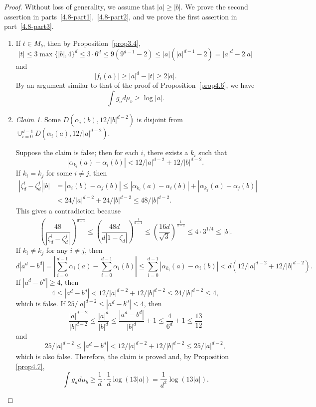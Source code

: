 \documentclass[11pt]{amsart}
\numberwithin{equation}{section}
\theoremstyle{plain}
\theoremstyle{definition}
\theoremstyle{remark}
\newtheorem*{claim*}{Claim}
\begin{document}
\begin{proof}
Without loss of generality, we assume that $|a|\geq|b|$. We prove
the second assertion in parts~\eqref{4.8-part1},~\eqref{4.8-part2}, and we prove the first assertion
in part~\eqref{4.8-part3}.

\begin{enumerate}[wide]
\item\label{4.8-part1}
   If $t\in M_{b}$, then by
Proposition~\ref{prop3.4},
\[
|t|\leq3\max\{|b|,4\}^{d}\leq3\cdot6^{d}\leq9\left(9^{d-1}-2\right)\leq|a|\left(|a|^{d-1}-2\right)=|a|^{d}-2|a|
\]
and
\[
|f_{t}(a)|\geq|a|^{d}-|t|\geq2|a|.
\]
By an argument similar to that of the proof of Proposition~\ref{prop4.6},
we have
\[
\int g_{a}d\mu_{b}\geq\log|a|.
\]

\item\label{4.8-part2}

\begin{claim*} Some $D(\alpha_{i}(b),12/|b|^{d-2})$ is disjoint
from $\cup_{i=0}^{d-1}D(\alpha_{i}(a),12/|a|^{d-2})$.
\end{claim*}

Suppose the claim is false; then for each $i$, there exists a $k_{i}$ such that
\[
|\alpha_{k_{i}}(a)-\alpha_{i}(b)|<12/|a|^{d-2}+12/|b|^{d-2}.
\]
If $k_{i}=k_{j}$ for some $i\neq j$, then
\begin{align*}
\left|\zeta_{d}^{i}-\zeta_{d}^{j}\right||b| & =|\alpha_{i}(b)-\alpha_{j}(b)|\leq|\alpha_{k_{i}}(a)-\alpha_{i}(b)|+|\alpha_{k_{j}}(a)-\alpha_{j}(b)|\\
 & <24/|a|^{d-2}+24/|b|^{d-2}\leq48/|b|^{d-2}.
\end{align*}
This gives a contradiction because
\[
\left(\frac{48}{\left|\zeta_{d}^{i}-\zeta_{d}^{j}\right|}\right)^{\frac{1}{d-1}}\leq\left(\frac{48d}{d\left|1-\zeta_{d}\right|}\right)^{\frac{1}{d-1}}\leq\left(\frac{16d}{\sqrt{3}}\right)^{\frac{1}{d-1}}\leq4\cdot3^{1/4}\leq|b|.
\]
If $k_{i}\neq k_{j}$ for any $i\neq j$, then
\[
d|a^{d}-b^{d}|=\left|\sum_{i=0}^{d-1}\alpha_{i}(a)-\sum_{i=0}^{d-1}\alpha_{i}(b)\right|\leq\sum_{i=0}^{d-1}\left|\alpha_{k_{i}}(a)-\alpha_{i}(b)\right|<d\left(12/|a|^{d-2}+12/|b|^{d-2}\right).
\]
If $|a^{d}-b^{d}|\geq4$, then
\[
4\leq\left|a^{d}-b^{d}\right|<12/|a|^{d-2}+12/|b|^{d-2}\leq24/|b|^{d-2}\leq4,
\]
which is false. If $25/|a|^{d-2}\leq|a^{d}-b^{d}|\leq4$, then
\[
\frac{|a|^{d-2}}{|b|^{d-2}}\leq\frac{|a|^{d}}{|b|^{d}}\leq\frac{|a^{d}-b^{d}|}{|b|^{d}}+1\leq\frac{4}{6^{d}}+1\leq\frac{13}{12}
\]
and
\[
25/|a|^{d-2}\leq|a^{d}-b^{d}|<12/|a|^{d-2}+12/|b|^{d-2}\leq25/|a|^{d-2},
\]
which is also false. Therefore, the claim is proved and, by Proposition
\ref{prop4.7},
\[
\int g_{a}d\mu_{b}\geq\frac{1}{d}\cdot\frac{1}{d}\log(13|a|)=\frac{1}{d^{2}}\log(13|a|).
\]


\end{enumerate}
\end{proof}
\end{document}
